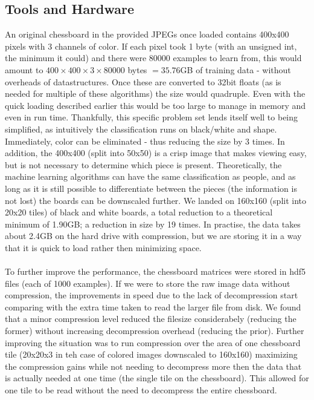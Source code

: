 \documentclass{article}
\begin{document}
\begin{multicols}{2}
\subsection{Tools and Hardware}
An original chessboard in the provided JPEGs once loaded contains 400x400 pixels with 3 channels of color. If each pixel took 1 byte (with an unsigned int, the minimum it could) and there were 80000 examples to learn from, this would amount to $400\times 400\times 3 \times 80000$ bytes $= 35.76$GB of training data - without overheads of datastructures. Once these are converted to 32bit floats (as is needed for multiple of these algorithms) the size would quadruple. Even with the quick loading described earlier this would be too large to manage in memory and even in run time. Thankfully, this specific problem set lends itself well to being simplified, as intuitively the classification runs on black/white and shape. Immediately, color can be eliminated - thus reducing the size by 3 times. In addition, the 400x400 (split into 50x50) is a crisp image that makes viewing easy, but is not necessary to determine which piece is present. Theoretically, the machine learning algorithms can have the same classification as people, and as long as it is still possible to differentiate between the pieces (the information is not lost) the boards can be downscaled further.
We landed on 160x160 (split into 20x20 tiles) of black and white boards, a total reduction to a theoretical minimum of 1.90GB; a reduction in size by 19 times. In practise, the data takes about 2.4GB on the hard drive with compression, but we are storing it in a way that it is quick to load rather then minimizing space.
\\
\\
To further improve the performance, the chessboard matrices were stored in hdf5 files (each of 1000 examples).
If we were to store the raw image data without compression, the improvements in speed due to the lack of decompression start comparing with the extra time taken to read the larger file from disk. We found that a minor compression level reduced the filesize considerabely (reducing the former) without increasing decompression overhead (reducing the prior). Further improving the situation was to run compression over the area of one chessboard tile (20x20x3 in teh case of colored images downscaled to 160x160) maximizing the compression gains while not needing to decompress more then the data that is actually needed at one time (the single tile on the chessboard). This allowed for one tile to be read without the need to decompress the entire chessboard.

\end{multicols}
\end{document}
